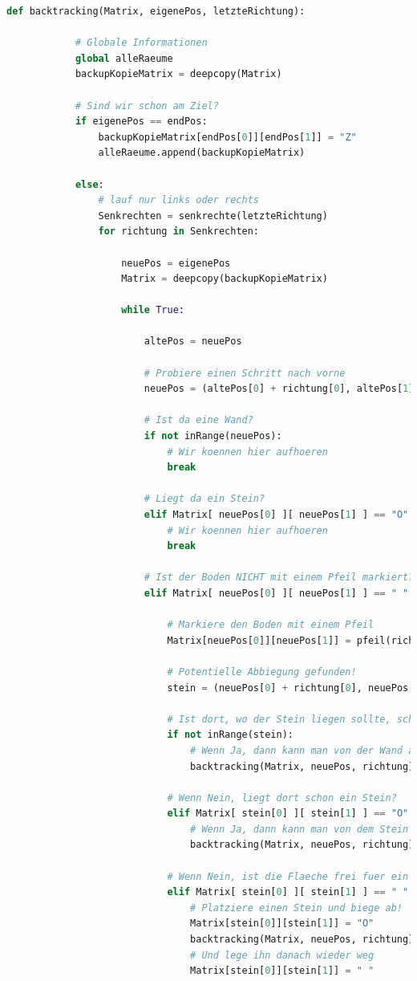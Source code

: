 \documentclass[a4paper,10pt,ngerman]{scrartcl}
\begin{document}
		\begin{lstlisting}[language=Python]
			def backtracking(Matrix, eigenePos, letzteRichtung):
			
			# Globale Informationen
			global alleRaeume
			backupKopieMatrix = deepcopy(Matrix)
			
			# Sind wir schon am Ziel?
			if eigenePos == endPos:
				backupKopieMatrix[endPos[0]][endPos[1]] = "Z"
				alleRaeume.append(backupKopieMatrix)
			
			else:
				# lauf nur links oder rechts
				Senkrechten = senkrechte(letzteRichtung)
				for richtung in Senkrechten:
					
					neuePos = eigenePos
					Matrix = deepcopy(backupKopieMatrix)
					
					while True:
					
						altePos = neuePos
						
						# Probiere einen Schritt nach vorne
						neuePos = (altePos[0] + richtung[0], altePos[1] + richtung[1])
						
						# Ist da eine Wand?
						if not inRange(neuePos):
							# Wir koennen hier aufhoeren
							break
						
						# Liegt da ein Stein?
						elif Matrix[ neuePos[0] ][ neuePos[1] ] == "O":
							# Wir koennen hier aufhoeren
							break
						
						# Ist der Boden NICHT mit einem Pfeil markiert?
						elif Matrix[ neuePos[0] ][ neuePos[1] ] == " ":
						
							# Markiere den Boden mit einem Pfeil
							Matrix[neuePos[0]][neuePos[1]] = pfeil(richtung)
							
							# Potentielle Abbiegung gefunden!
							stein = (neuePos[0] + richtung[0], neuePos[1] + richtung[1])
							
							# Ist dort, wo der Stein liegen sollte, schon eine Wand?
							if not inRange(stein):
								# Wenn Ja, dann kann man von der Wand aus abbiegen
								backtracking(Matrix, neuePos, richtung)
							
							# Wenn Nein, liegt dort schon ein Stein?
							elif Matrix[ stein[0] ][ stein[1] ] == "O":
								# Wenn Ja, dann kann man von dem Stein aus abbiegen
								backtracking(Matrix, neuePos, richtung)
							
							# Wenn Nein, ist die Flaeche frei fuer ein Stein?
							elif Matrix[ stein[0] ][ stein[1] ] == " ":
								# Platziere einen Stein und biege ab!
								Matrix[stein[0]][stein[1]] = "O"
								backtracking(Matrix, neuePos, richtung)
								# Und lege ihn danach wieder weg
								Matrix[stein[0]][stein[1]] = " "
		\end{lstlisting}
\end{document}
